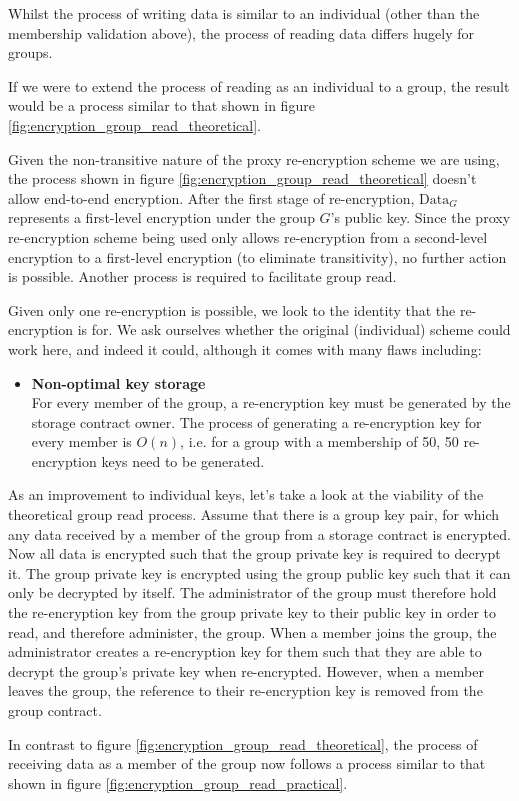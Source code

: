 Whilst the process of writing data is similar to an individual (other than the membership validation above), the process of reading data differs hugely for groups.

If we were to extend the process of reading as an individual to a group, the result would be a process similar to that shown in figure \ref{fig:encryption_group_read_theoretical}.



Given the non-transitive nature of the proxy re-encryption scheme we are using, the process shown in figure \ref{fig:encryption_group_read_theoretical} doesn't allow end-to-end encryption. After the first stage of re-encryption, $\text{Data}_{G}$ represents a first-level encryption under the group $G$'s public key. Since the proxy re-encryption scheme being used only allows re-encryption from a second-level encryption to a first-level encryption (to eliminate transitivity), no further action is possible. Another process is required to facilitate group read.

Given only one re-encryption is possible, we look to the identity that the re-encryption is for. We ask ourselves whether the original (individual) scheme could work here, and indeed it could, although it comes with many flaws including:

\begin{itemize}
  \item 
  	\textbf{Non-optimal key storage} \\
    For every member of the group, a re-encryption key must be generated by the storage contract owner. The process of generating a re-encryption key for every member is $O(n)$, i.e. for a group with a membership of 50, 50 re-encryption keys need to be generated.
\end{itemize}

As an improvement to individual keys, let's take a look at the viability of the theoretical group read process. Assume that there is a group key pair, for which any data received by a member of the group from a storage contract is encrypted. Now all data is encrypted such that the group private key is required to decrypt it. The group private key is encrypted using the group public key such that it can only be decrypted by itself. The administrator of the group must therefore hold the re-encryption key from the group private key to their public key in order to read, and therefore administer, the group. When a member joins the group, the administrator creates a re-encryption key for them such that they are able to decrypt the group's private key when re-encrypted. However, when a member leaves the group, the reference to their re-encryption key is removed from the group contract.

In contrast to figure \ref{fig:encryption_group_read_theoretical}, the process of receiving data as a member of the group now follows a process similar to that shown in figure \ref{fig:encryption_group_read_practical}.



